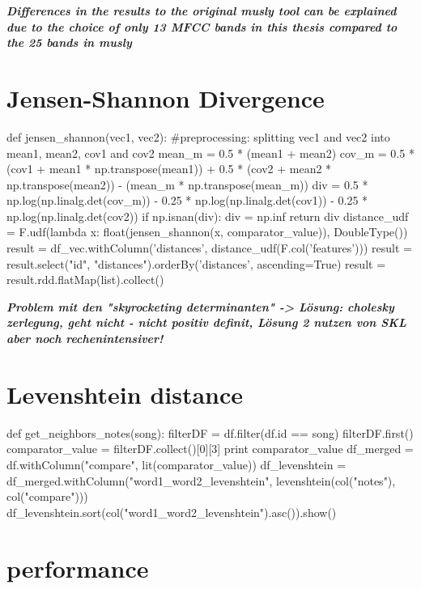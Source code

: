 \noindent\textbf{\textit{Differences in the results to the original musly tool can be explained due to the choice of only 13 MFCC bands in this thesis compared to the 25 bands in musly}\cite{musly1}}

\section{Jensen-Shannon Divergence}

\begin{pythonCode}
def jensen_shannon(vec1, vec2):
	#preprocessing: splitting vec1 and vec2 into mean1, mean2, cov1 and cov2
    mean_m = 0.5 * (mean1 + mean2)
    cov_m = 0.5 * (cov1 + mean1 * np.transpose(mean1)) + 0.5 * (cov2 + mean2 * np.transpose(mean2)) - (mean_m * np.transpose(mean_m))
    div = 0.5 * np.log(np.linalg.det(cov_m)) - 0.25 * np.log(np.linalg.det(cov1)) - 0.25 * np.log(np.linalg.det(cov2))  
    if np.isnan(div):
        div = np.inf
    return div
distance_udf = F.udf(lambda x: float(jensen_shannon(x, comparator_value)), DoubleType())
result = df_vec.withColumn('distances', distance_udf(F.col('features')))
result = result.select("id", "distances").orderBy('distances', ascending=True)
result = result.rdd.flatMap(list).collect()
\end{pythonCode}

\noindent\textbf{\textit{Problem mit den "skyrocketing determinanten" -> Lösung: cholesky zerlegung, geht nicht - nicht positiv definit, Lösung 2 nutzen von SKL aber noch rechenintensiver!}\cite[p.45]{schnitzer1}}

\section{Levenshtein distance}

\begin{pythonCode}
def get_neighbors_notes(song):
    filterDF = df.filter(df.id == song)
    filterDF.first()
    comparator_value = filterDF.collect()[0][3] 
    print comparator_value
    df_merged = df.withColumn("compare", lit(comparator_value))
    df_levenshtein = df_merged.withColumn("word1_word2_levenshtein", levenshtein(col("notes"), col("compare")))
    df_levenshtein.sort(col("word1_word2_levenshtein").asc()).show()
\end{pythonCode}

\section{performance}

